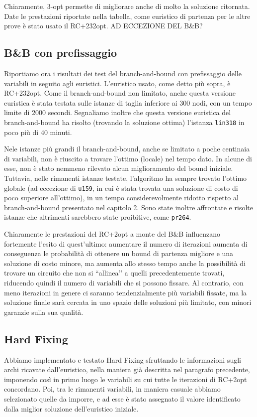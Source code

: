 Chiaramente, 3-opt permette di migliorare anche di molto la soluzione ritornata. Date le prestazioni riportate nella tabella, come euristico di partenza per le altre prove è stato usato il RC+232opt. AD ECCEZIONE DEL B\&B?

\subsection{B\&B con prefissaggio}
Riportiamo ora i risultati dei test del branch-and-bound con prefissaggio delle variabili in seguito agli euristici. L’euristico usato, come detto più sopra, è RC+232opt. Come il branch-and-bound non limitato, anche questa versione euristica è stata testata sulle istanze di taglia inferiore ai 300 nodi, con un tempo limite di 2000 secondi. Segnaliamo inoltre che questa versione euristica del branch-and-bound ha risolto (trovando la soluzione ottima) l’istanza \texttt{lin318} in poco più di 40 minuti.

Nele istanze più grandi il branch-and-bound, anche se limitato a poche centinaia di variabili, non è riuscito a trovare l’ottimo (locale) nel tempo dato. In alcune di esse, non è stato nemmeno rilevato alcun miglioramento del bound iniziale. Tuttavia, nelle rimanenti istanze testate, l’algoritmo ha sempre trovato l’ottimo globale (ad eccezione di \texttt{u159}, in cui è stata trovata una soluzione di costo di poco superiore all’ottimo), in un tempo considerevolmente ridotto rispetto al branch-and-bound presentato nel capitolo 2. Sono state inoltre affrontate e risolte istanze che altrimenti sarebbero state proibitive, come \texttt{pr264}.

Chiaramente le prestazioni del RC+2opt a monte del B\&B influenzano fortemente l’esito di quest’ultimo: aumentare il numero di iterazioni aumenta di conseguenza le probabilità di ottenere un bound di partenza migliore e una soluzione di costo minore, ma aumenta allo stesso tempo anche la possibilità di trovare un circuito che non si ``allinea’’ a quelli precedentemente trovati, riducendo quindi il numero di variabili che si possono fissare. Al contrario, con meno iterazioni in genere ci saranno tendenzialmente più variabili fissate, ma la soluzione finale sarà cercata in uno spazio delle soluzioni più limitato, con minori garanzie sulla sua qualità.

\subsection{Hard Fixing}
Abbiamo implementato e testato Hard Fixing sfruttando le informazioni sugli archi ricavate dall’euristico, nella maniera già descritta nel paragrafo precedente, imponendo così in primo luogo le variabili su cui tutte le iterazioni di RC+2opt concordano. Poi, tra le rimanenti variabili, in maniera casuale abbiamo selezionato quelle da imporre, e ad esse è stato assegnato il valore identificato dalla miglior soluzione dell’euristico iniziale.

